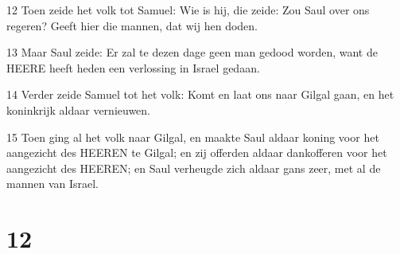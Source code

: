 \par 12 Toen zeide het volk tot Samuel: Wie is hij, die zeide: Zou Saul over ons regeren? Geeft hier die mannen, dat wij hen doden.
\par 13 Maar Saul zeide: Er zal te dezen dage geen man gedood worden, want de HEERE heeft heden een verlossing in Israel gedaan.
\par 14 Verder zeide Samuel tot het volk: Komt en laat ons naar Gilgal gaan, en het koninkrijk aldaar vernieuwen.
\par 15 Toen ging al het volk naar Gilgal, en maakte Saul aldaar koning voor het aangezicht des HEEREN te Gilgal; en zij offerden aldaar dankofferen voor het aangezicht des HEEREN; en Saul verheugde zich aldaar gans zeer, met al de mannen van Israel.

\chapter{12}

